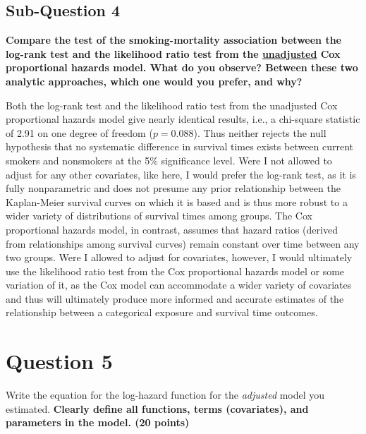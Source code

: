 \documentclass{article}\usepackage[]{graphicx}\usepackage[]{color}
\newif\ifdraft  %
\begin{document}
\vspace{2mm}

\subsection*{Sub-Question 4}
\textbf{Compare the test of the smoking-mortality association between the log-rank test and the likelihood ratio test from the \ul{unadjusted} Cox proportional hazards model. What do you observe? Between these two analytic approaches, which one would you prefer, and why?}

\vspace{2mm}



Both the log-rank test and the likelihood ratio test from the unadjusted Cox proportional hazards model give nearly identical results, i.e., a chi-square statistic of 2.91 on one degree of freedom ($p = 0.088$).  Thus neither rejects the null hypothesis that no systematic difference in survival times exists between current smokers and nonsmokers at the 5\% significance level.  Were I not allowed to adjust for any other covariates, like here, I would prefer the log-rank test, as it is fully nonparametric and does not presume any prior relationship between the Kaplan-Meier survival curves on which it is based and is thus more robust to a wider variety of distributions of survival times among groups.  The Cox proportional hazards model, in contrast, assumes that hazard ratios (derived from relationships among survival curves) remain constant over time between any two groups.  Were I allowed to adjust for covariates, however, I would ultimately use the likelihood ratio test from the Cox proportional hazards model or some variation of it, as the Cox model can accommodate a wider variety of covariates and thus will ultimately produce more informed and accurate estimates of the relationship between a categorical exposure and survival time outcomes.

\vspace{2mm}

\pagebreak

\section*{Question 5}

\ifdraft

Write the equation for the log-hazard function for the \textit{adjusted} model you estimated. \textbf{Clearly define all functions, terms (covariates), and parameters in the model. (20 points)}
\end{document}
